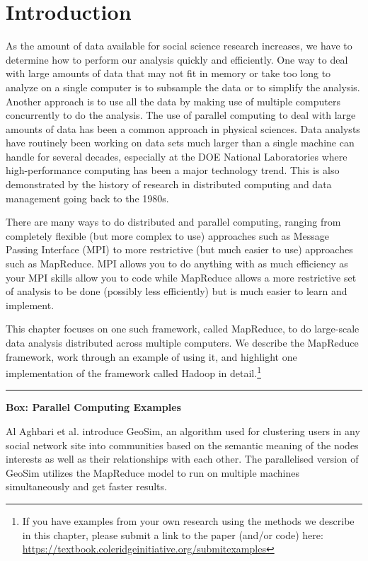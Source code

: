 \documentclass[]{krantz}
\begin{document}
\section{Introduction}\label{introduction-1}

As the amount of data available for social science research increases,
we have to determine how to perform our analysis quickly and
efficiently. One way to deal with large amounts of data that may not fit
in memory or take too long to analyze on a single computer is to
subsample the data or to simplify the analysis. Another approach is to
use all the data by making use of multiple computers concurrently to do
the analysis. The use of parallel computing to deal with large amounts
of data has been a common approach in physical sciences. Data analysts
have routinely been working on data sets much larger than a single
machine can handle for several decades, especially at the DOE National
Laboratories \citep{bigdata_old1, crossno1993heterogeneous} where
high-performance computing has been a major technology trend. This is
also demonstrated by the history of research in distributed computing
and data management going back to the 1980s.

There are many ways to do distributed and parallel computing, ranging
from completely flexible (but more complex to use) approaches such as
Message Passing Interface (MPI) \citep{mpi} to more restrictive (but
much easier to use) approaches such as MapReduce. MPI allows you to do
anything with as much efficiency as your MPI skills allow you to code
while MapReduce allows a more restrictive set of analysis to be done
(possibly less efficiently) but is much easier to learn and implement.

This chapter focuses on one such framework, called MapReduce, to do
large-scale data analysis distributed across multiple computers. We
describe the MapReduce framework, work through an example of using it,
and highlight one implementation of the framework called Hadoop in
detail.\footnote{If you have examples from your own research using the
  methods we describe in this chapter, please submit a link to the paper
  (and/or code) here:
  \url{https://textbook.coleridgeinitiative.org/submitexamples}}

\begin{center}\rule{0.5\linewidth}{\linethickness}\end{center}

\textbf{Box: Parallel Computing Examples}

Al Aghbari et al. \citeyearpar{aghbari2019} introduce GeoSim, an
algorithm used for clustering users in any social network site into
communities based on the semantic meaning of the nodes interests as well
as their relationships with each other. The parallelised version of
GeoSim utilizes the MapReduce model to run on multiple machines
simultaneously and get faster results.
\end{document}
